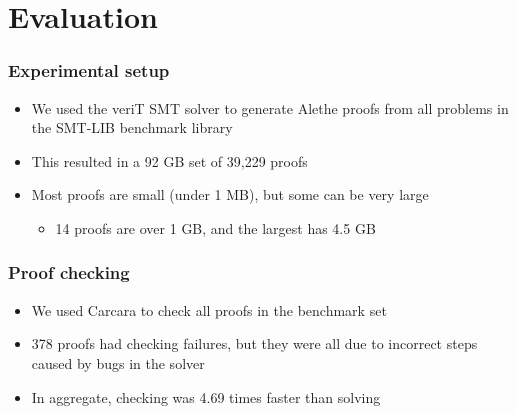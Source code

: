 \documentclass[usepdftitle=false,aspectratio=169]{beamer}
\newcommand\vitem{\vfill\item}
\begin{document}
\section{Evaluation}

\begin{frame}
  \frametitle{Experimental setup}
  \begin{itemize}
    \item We used the veriT SMT solver to generate Alethe proofs from all
    problems in the SMT-LIB benchmark library
    \vitem This resulted in a 92 GB set of 39,229 proofs
    \vitem Most proofs are small (under 1 MB), but some can be very large
    \begin{itemize}
      \item 14 proofs are over 1 GB, and the largest has 4.5 GB
    \end{itemize}
  \end{itemize}
\end{frame}

\begin{frame}
  \frametitle{Proof checking}
  \begin{itemize}
    \item We used Carcara to check all proofs in the benchmark set
    \vitem 378 proofs had checking failures, but they were all due to incorrect
    steps caused by bugs in the solver
    \vitem In aggregate, checking was 4.69 times faster than solving
  \end{itemize}
\end{frame}
\end{document}
